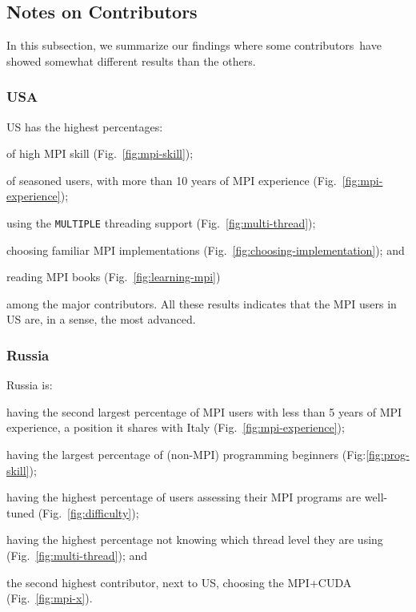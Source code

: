 \documentclass[preprint,5p,times]{elsarticle}
\newcommand{\revision}[2]{{\color{blue}#2}}
\def\country{contributor\xspace{}}%
\def\countries{contributors\xspace{}}%
\def\Countries{Contributors\xspace{}}%
\def\mcountries{major contributors\xspace{}}%
\begin{document}
\subsection{Notes on \Countries}

In this subsection, we summarize our findings where some
\revision{\countries have}{\countries\ have} showed
somewhat different results than the others.

\subsubsection*{USA}

US has the highest percentages:
\begin{enumerate*}
\item of high MPI skill (Fig.~\ref{fig:mpi-skill})\revision{,}{;}
\item of seasoned users, with more than 10 years of MPI experience (Fig.~\ref{fig:mpi-experience})\revision{,}{;}
\item using the {\tt MULTIPLE} threading support
  (Fig.~\ref{fig:multi-thread})\revision{,}{;}
\item choosing familiar MPI implementations
  (Fig.~\ref{fig:choosing-implementation})\revision{,}{;} and
\item reading MPI books (Fig.~\ref{fig:learning-mpi})
\end{enumerate*}
among the \mcountries. All these results indicates that the MPI
users in US are, \revision{by some standards}{in a sense,} the most advanced.

\subsubsection*{Russia}

Russia is:
\begin{enumerate*}
\item having the second largest percentage of MPI users with less than 5
  years of MPI experience, a position it shares with Italy
  (Fig.~\ref{fig:mpi-experience})\revision{,}{;}
\item having the largest percentage of (non-MPI) programming beginners
  (Fig:\ref{fig:prog-skill})\revision{,}{;}
\item having the highest percentage of users assessing their MPI programs are
  well-tuned (Fig.~\ref{fig:difficulty})\revision{,}{;}
\item having the highest percentage not knowing which thread level
  they are using (Fig.~\ref{fig:multi-thread})\revision{,}{;} and
\item the second highest \country, next to US, choosing the MPI+CUDA
  (Fig.~\ref{fig:mpi-x}).
\end{enumerate*}
\end{document}
